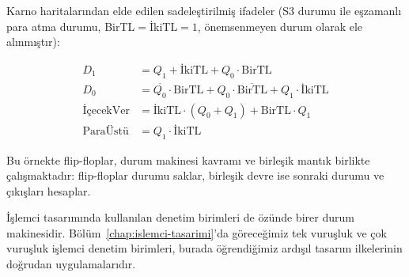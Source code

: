 \begin{ornek}[B.16]
Karno haritalarından elde edilen sadeleştirilmiş ifadeler (S3 durumu ile eşzamanlı para atma durumu, BirTL$=$İkiTL$=1$, önemsenmeyen durum olarak ele alınmıştır):

\[
\begin{aligned}
D_1          &= Q_1 + \text{İkiTL} + Q_0 \cdot \text{BirTL} \\
D_0          &= \overline{Q_0} \cdot \text{BirTL}
                 + Q_0 \cdot \overline{\text{BirTL}}
                 + Q_1 \cdot \text{İkiTL} \\
\text{İçecekVer} &= \text{İkiTL} \cdot (Q_0 + Q_1) + \text{BirTL} \cdot Q_1 \\
\text{ParaÜstü}  &= Q_1 \cdot \text{İkiTL}
\end{aligned}
\]

Bu örnekte flip-floplar, durum makinesi kavramı ve birleşik mantık birlikte çalışmaktadır: flip-floplar durumu saklar, birleşik devre ise sonraki durumu ve çıkışları hesaplar.

İşlemci tasarımında kullanılan denetim birimleri de özünde birer durum makinesidir. Bölüm~\ref{chap:islemci-tasarimi}'da göreceğimiz tek vuruşluk ve çok vuruşluk işlemci denetim birimleri, burada öğrendiğimiz ardışıl tasarım ilkelerinin doğrudan uygulamalarıdır.

\end{ornek}


